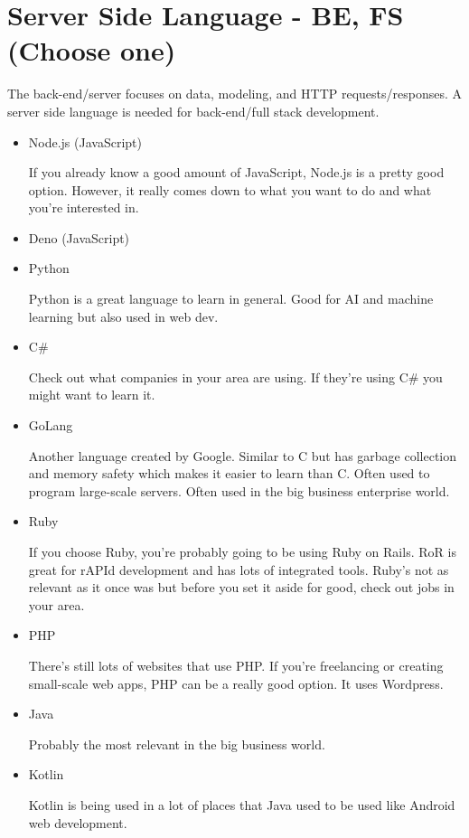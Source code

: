 \section{Server Side Language - BE, FS \small{(Choose one)}}
The back-end/server focuses on data, modeling, and HTTP requests/responses. A server side language is needed for back-end/full stack development.

\begin{itemize}
    \item Node.js (JavaScript)
    
    If you already know a good amount of JavaScript, Node.js is a pretty good option. However, it really comes down to what you want to do and what you're interested in.
    \item Deno (JavaScript)
    \item Python
    
    Python is a great language to learn in general. Good for AI and machine learning but also used in web dev.
    \item C\#
    
    Check out what companies in your area are using. If they're using C\# you might want to learn it.
    \item GoLang
    
    Another language created by Google. Similar to C but has garbage collection and memory safety which makes it easier to learn than C. Often used to program large-scale servers. Often used in the big business enterprise world.
    \item Ruby
    
    If you choose Ruby, you're probably going to be using Ruby on Rails. RoR is great for rAPId development and has lots of integrated tools. Ruby's not as relevant as it once was but before you set it aside for good, check out jobs in your area.
    \item PHP
    
    There's still lots of websites that use PHP. If you're freelancing or creating small-scale web apps, PHP can be a really good option. It uses Wordpress. 
    \item Java
    
    Probably the most relevant in the big business world. 
    \item Kotlin
    
    Kotlin is being used in a lot of places that Java used to be used like Android web development.
\end{itemize}

